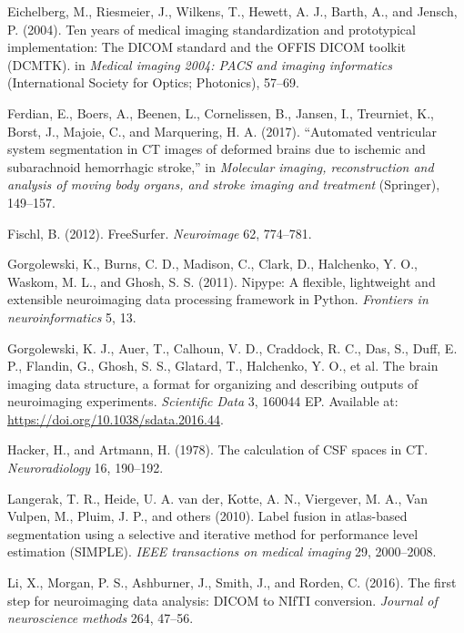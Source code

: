 \documentclass[utf8]{frontiersSCNS}
\begin{document}
\leavevmode\hypertarget{ref-dcmtk}{}%
Eichelberg, M., Riesmeier, J., Wilkens, T., Hewett, A. J., Barth, A., and Jensch, P. (2004). Ten years of medical imaging standardization and prototypical implementation: The DICOM standard and the OFFIS DICOM toolkit (DCMTK). in \emph{Medical imaging 2004: PACS and imaging informatics} (International Society for Optics; Photonics), 57--69.

\leavevmode\hypertarget{ref-ferdian2017automated}{}%
Ferdian, E., Boers, A., Beenen, L., Cornelissen, B., Jansen, I., Treurniet, K., Borst, J., Majoie, C., and Marquering, H. A. (2017). ``Automated ventricular system segmentation in CT images of deformed brains due to ischemic and subarachnoid hemorrhagic stroke,'' in \emph{Molecular imaging, reconstruction and analysis of moving body organs, and stroke imaging and treatment} (Springer), 149--157.

\leavevmode\hypertarget{ref-freesurfer}{}%
Fischl, B. (2012). FreeSurfer. \emph{Neuroimage} 62, 774--781.

\leavevmode\hypertarget{ref-nipype}{}%
Gorgolewski, K., Burns, C. D., Madison, C., Clark, D., Halchenko, Y. O., Waskom, M. L., and Ghosh, S. S. (2011). Nipype: A flexible, lightweight and extensible neuroimaging data processing framework in Python. \emph{Frontiers in neuroinformatics} 5, 13.

\leavevmode\hypertarget{ref-bids}{}%
Gorgolewski, K. J., Auer, T., Calhoun, V. D., Craddock, R. C., Das, S., Duff, E. P., Flandin, G., Ghosh, S. S., Glatard, T., Halchenko, Y. O., et al. The brain imaging data structure, a format for organizing and describing outputs of neuroimaging experiments. \emph{Scientific Data} 3, 160044 EP. Available at: \url{https://doi.org/10.1038/sdata.2016.44}.

\leavevmode\hypertarget{ref-oldcsf}{}%
Hacker, H., and Artmann, H. (1978). The calculation of CSF spaces in CT. \emph{Neuroradiology} 16, 190--192.

\leavevmode\hypertarget{ref-langerak2010label}{}%
Langerak, T. R., Heide, U. A. van der, Kotte, A. N., Viergever, M. A., Van Vulpen, M., Pluim, J. P., and others (2010). Label fusion in atlas-based segmentation using a selective and iterative method for performance level estimation (SIMPLE). \emph{IEEE transactions on medical imaging} 29, 2000--2008.

\leavevmode\hypertarget{ref-dcm2niix}{}%
Li, X., Morgan, P. S., Ashburner, J., Smith, J., and Rorden, C. (2016). The first step for neuroimaging data analysis: DICOM to NIfTI conversion. \emph{Journal of neuroscience methods} 264, 47--56.
\end{document}
